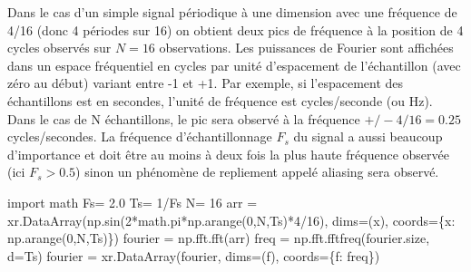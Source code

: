 \documentclass[
  french,
  11pt,
  letterpaper,
  open=any,
  twoside=false,
  french]{scrbook}
\newenvironment{Shaded}{\begin{snugshade}}{\end{snugshade}}
\newcommand{\DecValTok}[1]{\textcolor[rgb]{0.68,0.00,0.00}{#1}}
\newcommand{\FloatTok}[1]{\textcolor[rgb]{0.68,0.00,0.00}{#1}}
\newcommand{\ImportTok}[1]{\textcolor[rgb]{0.00,0.46,0.62}{#1}}
\newcommand{\NormalTok}[1]{\textcolor[rgb]{0.00,0.23,0.31}{#1}}
\newcommand{\OperatorTok}[1]{\textcolor[rgb]{0.37,0.37,0.37}{#1}}
\newcommand{\StringTok}[1]{\textcolor[rgb]{0.13,0.47,0.30}{#1}}
\begin{document}
Dans le cas d'un simple signal périodique à une dimension avec une
fréquence de 4/16 (donc 4 périodes sur 16) on obtient deux pics de
fréquence à la position de 4 cycles observés sur \(N=16\) observations.
Les puissances de Fourier sont affichées dans un espace fréquentiel en
cycles par unité d'espacement de l'échantillon (avec zéro au début)
variant entre -1 et +1. Par exemple, si l'espacement des échantillons
est en secondes, l'unité de fréquence est cycles/seconde (ou Hz). Dans
le cas de N échantillons, le pic sera observé à la fréquence
\(+/- 4/16=0.25\) cycles/secondes. La fréquence d'échantillonnage
\(F_s\) du signal a aussi beaucoup d'importance et doit être au moins à
deux fois la plus haute fréquence observée (ici \(F_s > 0.5\)) sinon un
phénomène de repliement appelé aliasing sera observé.

\begin{Shaded}
\begin{Highlighting}[]
\ImportTok{import}\NormalTok{ math}
\NormalTok{Fs}\OperatorTok{=} \FloatTok{2.0}
\NormalTok{Ts}\OperatorTok{=} \DecValTok{1}\OperatorTok{/}\NormalTok{Fs}
\NormalTok{N}\OperatorTok{=} \DecValTok{16}
\NormalTok{arr }\OperatorTok{=}\NormalTok{ xr.DataArray(np.sin(}\DecValTok{2}\OperatorTok{*}\NormalTok{math.pi}\OperatorTok{*}\NormalTok{np.arange(}\DecValTok{0}\NormalTok{,N,Ts)}\OperatorTok{*}\DecValTok{4}\OperatorTok{/}\DecValTok{16}\NormalTok{),}
\NormalTok{                   dims}\OperatorTok{=}\NormalTok{(}\StringTok{\textquotesingle{}x\textquotesingle{}}\NormalTok{), coords}\OperatorTok{=}\NormalTok{\{}\StringTok{\textquotesingle{}x\textquotesingle{}}\NormalTok{: np.arange(}\DecValTok{0}\NormalTok{,N,Ts)\})}
\NormalTok{fourier }\OperatorTok{=}\NormalTok{ np.fft.fft(arr)}
\NormalTok{freq }\OperatorTok{=}\NormalTok{ np.fft.fftfreq(fourier.size, d}\OperatorTok{=}\NormalTok{Ts)}
\NormalTok{fourier }\OperatorTok{=}\NormalTok{ xr.DataArray(fourier,}
\NormalTok{                   dims}\OperatorTok{=}\NormalTok{(}\StringTok{\textquotesingle{}f\textquotesingle{}}\NormalTok{), coords}\OperatorTok{=}\NormalTok{\{}\StringTok{\textquotesingle{}f\textquotesingle{}}\NormalTok{: freq\})}


\end{Highlighting}
\end{Shaded}
\end{document}
